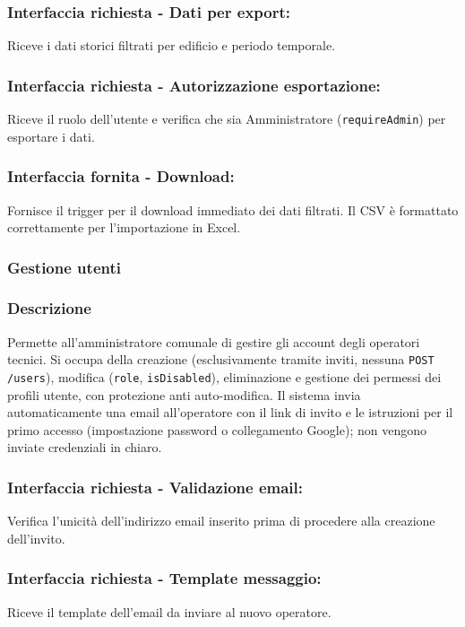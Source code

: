         \subsubsection*{Interfaccia richiesta - Dati per export:}
            Riceve i dati storici filtrati per edificio e periodo temporale.
        \subsubsection*{Interfaccia richiesta - Autorizzazione esportazione:}
            Riceve il ruolo dell'utente e verifica che sia Amministratore (\texttt{requireAdmin}) per esportare i dati.
        \subsubsection*{Interfaccia fornita - Download:}
            Fornisce il trigger per il download immediato dei dati filtrati. Il CSV \`e formattato correttamente per l'importazione in Excel.

    \subsubsection{Gestione utenti}
        \subsubsection*{Descrizione}
            Permette all'amministratore comunale di gestire gli account degli operatori tecnici. Si occupa della creazione (esclusivamente tramite inviti, nessuna \texttt{POST /users}), modifica (\texttt{role}, \texttt{isDisabled}), eliminazione e gestione dei permessi dei profili utente, con protezione anti auto-modifica. Il sistema invia automaticamente una email all'operatore con il link di invito e le istruzioni per il primo accesso (impostazione password o collegamento Google); non vengono inviate credenziali in chiaro.
        \subsubsection*{Interfaccia richiesta - Validazione email:}
            Verifica l'unicità dell'indirizzo email inserito prima di procedere alla creazione dell'invito.
        \subsubsection*{Interfaccia richiesta - Template messaggio:}
            Riceve il template dell'email da inviare al nuovo operatore.
